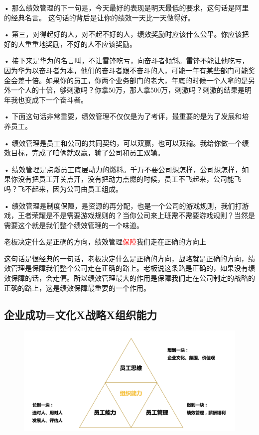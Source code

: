 \documentclass[12pt]{article}
\begin{document}
• 那么绩效管理的下一句是，今天最好的表现是明天最低的要求，这句话是阿里的经典名言。 这句话的背后是让你的绩效一天比一天做得好。

• 第三，对得起好的人，对不起不好的人，绩效奖励时应该什么公平。你应该把好的人重重地奖励，不好的人不应该奖励。

• 接下来是华为的名言叫，不让雷锋吃亏，向奋斗者倾斜。雷锋不能让他吃亏，因为华为以奋斗者为本，他们的奋斗者跟不奋斗的人，可能一年有某些部门可能奖金会差十倍。如果你的员工，你两个业务部门的老大，年底的时候一个人拿的是另外一个人的十倍，够刺激吗？你拿50万，那人拿500万，刺激吗？刺激的结果是明年我也变成下一个奋斗者。

• 下面这句话非常重要，绩效管理不仅仅是为了考评，最重要的是为了发展和培养员工。

• 绩效管理是员工和公司的共同契约，可以双赢，也可以双输。我给你做一个绩效目标，完成了咱俩就双赢，输了公司和员工双输。

• 绩效管理是点燃员工底层动力的燃料。千万不要公司想怎样，公司想怎样，如果你没有把员工开关点开，没有把动力点燃的时候，员工不飞起来，公司能飞 吗？飞不起来，因为公司由员工组成。

• 绩效管理是制度保障，是资源的再分配，也是一个公司的游戏规则，我们打游戏，王者荣耀是不是需要游戏规则的？当你公司来上班需不需要游戏规则？当然是需要这个就是我们整个绩效管理的一个味道。

\begin{framed}
老板决定什么是正确的方向，绩效管理\textcolor{red}{保障}我们走在正确的方向上

这句话是很经典的一句话，老板决定什么是正确的方向，战略就是正确的方向，绩效管理是保障我们整个公司走在正确的路上。老板说这条路是正确的，如果没有绩效保障的话，会走偏。所以绩效管理最大的作用是保障我们走在公司制定的战略的正确的路上，这是绩效保障最重要的一个作用。
\end{framed}

\subsection{企业成功=文化X战略X组织能力}
\begin{figure}[H]
    \centering
    \includegraphics[width=1\textwidth]{fig/Ali_Performance_1.png}
\end{figure}
\end{document}
